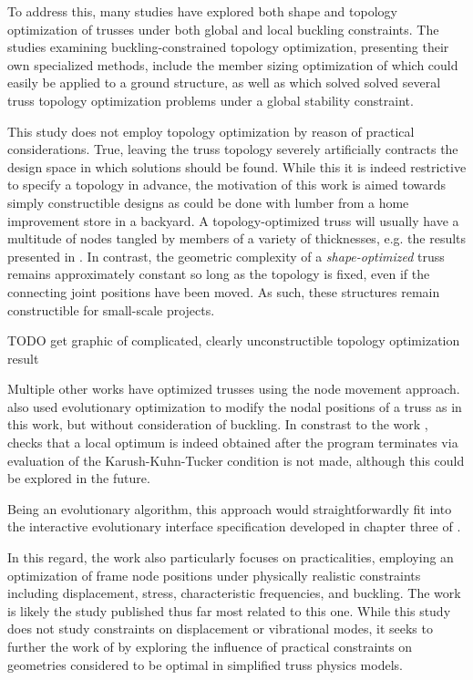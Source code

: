 \documentclass{article}
\begin{document}
To address this, many studies have explored both shape and topology optimization
of trusses under both global and local buckling constraints.
The studies examining buckling-constrained topology optimization, presenting their
own specialized methods, include the member sizing optimization of \cite{ben-talOptimalDesignTrusses2000}
which could easily be applied to a ground structure, as well as \cite{kocvaraModellingSolvingTruss2002}
which solved solved several truss topology optimization problems under a
global stability constraint.

This study does not employ topology optimization by reason of practical considerations.
True, leaving the truss topology severely artificially contracts the design space in which solutions should be found.
While this it is indeed restrictive to specify a topology in advance, the motivation
of this work is aimed towards simply constructible designs as could be done with
lumber from a home improvement store in a backyard. A topology-optimized truss
will usually have a multitude of nodes tangled by members of a variety of thicknesses,
e.g. the results presented in \cite{bendsoeTopologyDesignTruss2004}. In contrast, the geometric complexity
of a \textit{shape-optimized} truss remains approximately constant so long as the topology is
fixed, even if the connecting joint positions have been moved. As such, these structures
remain constructible for small-scale projects.

TODO get graphic of complicated, clearly unconstructible topology optimization result

Multiple other works have optimized trusses using the node movement approach.
\cite{wangTrussShapeOptimization2002} also used evolutionary optimization to modify the
nodal positions of a truss as in this work, but without consideration of buckling.
In constrast to the work \cite{wangTrussShapeOptimization2002}, checks that a local
optimum is indeed obtained after the program terminates via evaluation of the Karush-Kuhn-Tucker condition
is not made, although this could be explored in the future.

Being an evolutionary algorithm, this approach would straightforwardly fit into
the interactive evolutionary interface specification developed in chapter three of \cite{muellerComputationalExplorationStructural2014}.

In this regard, the work \cite{pedersenOptimizationPracticalTrusses2003} also particularly focuses
on practicalities, employing an optimization of frame node positions under physically realistic
constraints including  displacement, stress, characteristic frequencies, and buckling.
The work \cite{pedersenOptimizationPracticalTrusses2003} is likely the study published
thus far most related to this one. While this study does not study constraints on displacement
or vibrational modes, it seeks to further the work of \cite{pedersenOptimizationPracticalTrusses2003}
by exploring the influence of practical constraints on geometries considered to be optimal
in simplified truss physics models.
\end{document}
